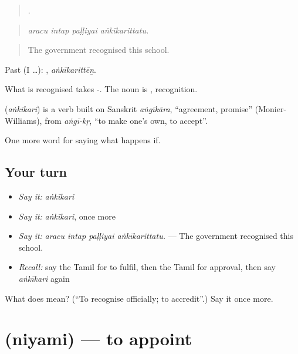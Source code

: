 \begin{quote}
   .
\end{quote}

\begin{quote}
\emph{aracu intap paḷḷiyai aṅkīkarittatu.}
\end{quote}

\begin{quote}
The government recognised this school.
\end{quote}

Past (I …): , \emph{aṅkīkarittēṉ}.

What is recognised takes -. The noun is , recognition.

\begin{cousinweb}
\textbf{} (\emph{aṅkīkari}) is a verb built on Sanskrit \emph{aṅgīkāra}, \textquotedblleft{}agreement, promise\textquotedblright{} (Monier-Williams), from \emph{aṅgī-kṛ}, \textquotedblleft{}to make one's own, to accept\textquotedblright{}.
\end{cousinweb}

\begin{grammarlens}[title={What you've built}]
One more word for saying what happens if.
\end{grammarlens}

\subsection*{Your turn}
\begin{itemize}
\raggedright
  \item \emph{Say it:} \emph{aṅkīkari}
  \item \emph{Say it:} \emph{aṅkīkari}, once more
  \item \emph{Say it:} \emph{aracu intap paḷḷiyai aṅkīkarittatu.} — The government recognised this school.
  \item \emph{Recall:} say the Tamil for to fulfil, then the Tamil for approval, then say \emph{aṅkīkari} again
\end{itemize}

\begin{tcolorbox}[breakable,colback=teal!4,colframe=teal!35!black,title={Before you move on}]
What does  mean? (\textquotedblleft{}To recognise officially; to accredit\textquotedblright{}.) Say it once more.
\end{tcolorbox}
\section[\texorpdfstring{\ta{நியமி} (niyami)}{நியமி (niyami)}]{ (niyami) — to appoint}

